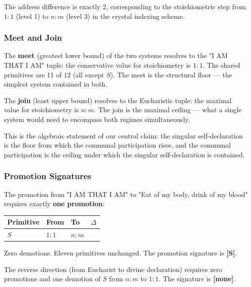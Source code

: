 \documentclass[12pt,a4paper]{article}
\begin{document}
The address difference is exactly 2, corresponding to the stoichiometric step from $1{:}1$ (level 1) to $n{:}m$ (level 3) in the crystal indexing scheme.

\subsubsection{Meet and Join}

The \textbf{meet} (greatest lower bound) of the two systems resolves to the "I AM THAT I AM" tuple: the conservative value for stoichiometry is $1{:}1$. The shared primitives are 11 of 12 (all except $S$). The meet is the structural floor --- the simplest system contained in both.

The \textbf{join} (least upper bound) resolves to the Eucharistic tuple: the maximal value for stoichiometry is $n{:}m$. The join is the maximal ceiling --- what a single system would need to encompass both regimes simultaneously.

This is the algebraic statement of our central claim: the singular self-declaration is the floor from which the communal participation rises, and the communal participation is the ceiling under which the singular self-declaration is contained.

\subsubsection{Promotion Signatures}

The promotion from "I AM THAT I AM" to "Eat of my body, drink of my blood" requires exactly \textbf{one promotion}:

\begin{table}[htbp]
\centering
\small
{}
\begin{tabularx}{\textwidth}{>{\centering\arraybackslash}X >{\centering\arraybackslash}X >{\centering\arraybackslash}X >{\centering\arraybackslash}X}
\toprule
\rowcolor{gray!25}\textbf{Primitive} & \textbf{From} & \textbf{To} & \textbf{$\Delta$} \\
\midrule
\rowcolors{1}{white}{gray!10}
$S$ & $1{:}1$ & $n{:}m$ & 2 \\
\bottomrule
\end{tabularx}
\end{table}

Zero demotions. Eleven primitives unchanged. The promotion signature is \textbf{{[}S{]}}.

The reverse direction (from Eucharist to divine declaration) requires zero promotions and one demotion of $S$ from $n{:}m$ to $1{:}1$. The signature is \textbf{{[}none{]}}.
\end{document}
